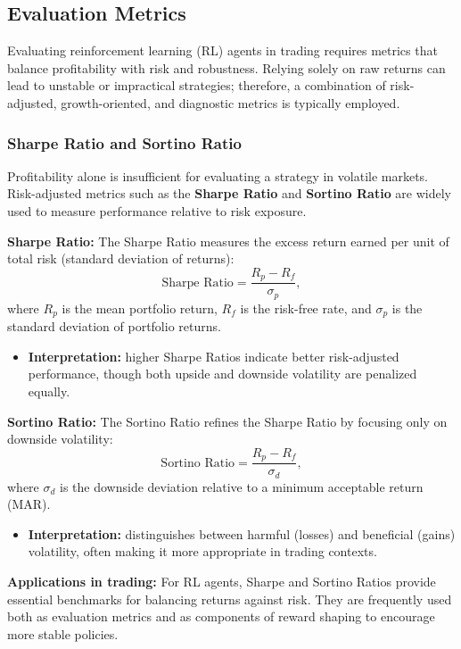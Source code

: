 \documentclass[12pt,a4paper]{report}
\begin{document}

\subsection{Evaluation Metrics}

Evaluating reinforcement learning (RL) agents in trading requires metrics that balance profitability with risk and robustness. Relying solely on raw returns can lead to unstable or impractical strategies; therefore, a combination of risk-adjusted, growth-oriented, and diagnostic metrics is typically employed.

\subsubsection{Sharpe Ratio and Sortino Ratio}

Profitability alone is insufficient for evaluating a strategy in volatile markets. Risk-adjusted metrics such as the \textbf{Sharpe Ratio} and \textbf{Sortino Ratio} are widely used to measure performance relative to risk exposure.

\bigskip
\textbf{Sharpe Ratio:}  
The Sharpe Ratio measures the excess return earned per unit of total risk (standard deviation of returns):
\[
\text{Sharpe Ratio} = \frac{R_p - R_f}{\sigma_p},
\]
where $R_p$ is the mean portfolio return, $R_f$ is the risk-free rate, and $\sigma_p$ is the standard deviation of portfolio returns.  
\begin{itemize}
    \item \textbf{Interpretation:} higher Sharpe Ratios indicate better risk-adjusted performance, though both upside and downside volatility are penalized equally.
\end{itemize}

\bigskip
\textbf{Sortino Ratio:}  
The Sortino Ratio refines the Sharpe Ratio by focusing only on downside volatility:
\[
\text{Sortino Ratio} = \frac{R_p - R_f}{\sigma_d},
\]
where $\sigma_d$ is the downside deviation relative to a minimum acceptable return (MAR).  
\begin{itemize}
    \item \textbf{Interpretation:} distinguishes between harmful (losses) and beneficial (gains) volatility, often making it more appropriate in trading contexts.
\end{itemize}

\bigskip
\textbf{Applications in trading:}  
For RL agents, Sharpe and Sortino Ratios provide essential benchmarks for balancing returns against risk. They are frequently used both as evaluation metrics and as components of reward shaping to encourage more stable policies.
\end{document}
